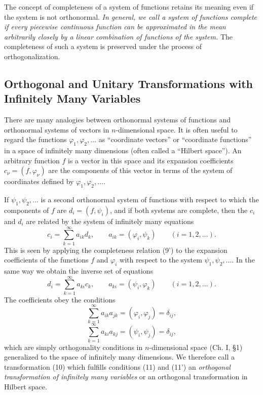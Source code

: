 The concept of completeness of a system of functions retains its meaning even if the system is not orthonormal. \emph{In general, we call a system of functions complete if every piecewise continuous function can be approximated in the mean arbitrarily closely by a linear combination of functions of the system.} The completeness of such a system is preserved under the process of orthogonalization.

\subsection{Orthogonal and Unitary Transformations with Infinitely Many Variables}
There are many analogies between orthonormal systems of functions and orthonormal systems of vectors in $n$-dimensional space. It is often useful to regard the functions $\varphi_1,\varphi_2,\ldots$ as ``coordinate vectors'' or ``coordinate functions'' in a space of infinitely many dimensions (often called a ``Hilbert space''). An arbitrary function $f$ is a vector in this space and its expansion coefficients $c_\nu=(f,\varphi_\nu)$ are the components of this vector in terms of the system of coordinates defined by $\varphi_1,\varphi_2,\ldots$.

If $\psi_1,\psi_2,\ldots$ is a second orthonormal system of functions with respect to which the components of $f$ are $d_i=(f,\psi_i)$, and if both systems are complete, then the $c_i$ and $d_i$ are related by the system of infinitely many equations
\begin{equation}
c_i=\sum_{k=1}^{\infty}a_{ik}d_k,\qquad a_{ik}=(\varphi_i,\psi_k)\qquad(i=1,2,\ldots).
\tag{10}
\end{equation}
This is seen by applying the completeness relation (9') to the expansion coefficients of the functions $f$ and $\varphi_i$ with respect to the system $\psi_1,\psi_2,\ldots$. In the same way we obtain the inverse set of equations
\begin{equation}
d_i=\sum_{k=1}^{\infty}a_{ki}c_k,\qquad a_{ki}=(\psi_i,\varphi_k)\qquad(i=1,2,\ldots).
\tag{10'}
\end{equation}
The coefficients obey the conditions
\begin{equation}
\sum_{k=1}^{\infty}a_{ik}a_{jk}=(\varphi_i,\varphi_j)=\delta_{ij},
\tag{11}
\end{equation}
\begin{equation}
\sum_{k=1}^{\infty}a_{ki}a_{kj}=(\psi_i,\psi_j)=\delta_{ij},
\tag{11'}
\end{equation}
which are simply orthogonality conditions in $n$-dimensional space (Ch. I, \S1) generalized to the space of infinitely many dimensions. We therefore call a transformation (10) which fulfills conditions (11) and (11') an \emph{orthogonal transformation of infinitely many variables} or an orthogonal transformation in Hilbert space.

